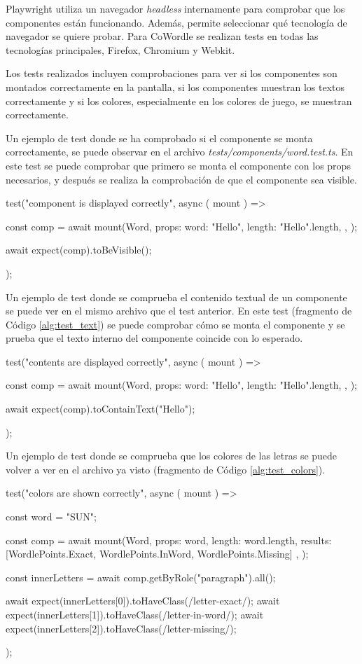 Playwright utiliza un navegador \textit{headless} internamente para comprobar que los componentes están funcionando. Además, permite seleccionar qué tecnología de navegador se quiere probar. Para CoWordle se realizan tests en todas las tecnologías principales, Firefox, Chromium y Webkit.

Los tests realizados incluyen comprobaciones para ver si los componentes son montados correctamente en la pantalla, si los componentes muestran los textos correctamente y si los colores, especialmente en los colores de juego, se muestran correctamente.

Un ejemplo de test donde se ha comprobado si el componente se monta correctamente, se puede observar en el archivo \textit{tests/components/word.test.ts}. En este test se puede comprobar que primero se monta el componente con los props necesarios, y después se realiza la comprobación de que el componente sea visible.

\begin{mytypescript}[float={!h},caption={Ejemplo test visibilidad componente.},label={alg:test_visibility}]
	test("component is displayed correctly", async ({ mount }) => {
		const comp = await mount(Word, {
			props: {
				word: "Hello",
				length: "Hello".length,
			},
		});

		await expect(comp).toBeVisible();
	});
\end{mytypescript}

Un ejemplo de test donde se comprueba el contenido textual de un componente se puede ver en el mismo archivo que el test anterior.
En este test (fragmento de Código \ref{alg:test_text}) se puede comprobar cómo se monta el componente y se prueba que el texto interno del componente coincide con lo esperado.

\begin{mytypescript}[float={!h},caption={Ejemplo test con texto.},label={alg:test_text}]
	test("contents are displayed correctly", async ({ mount }) => {
		const comp = await mount(Word, {
			props: {
				word: "Hello",
				length: "Hello".length,
			},
		});


		await expect(comp).toContainText("Hello");
	});
\end{mytypescript}

Un ejemplo de test donde se comprueba que los colores de las letras se puede volver a ver en el archivo ya visto (fragmento de Código \ref{alg:test_colors}).

\begin{mytypescript}[float={!h},caption={Ejemplo test colores.},label={alg:test_colors}]
	test("colors are shown correctly", async ({ mount }) => {
		const word = "SUN";


		const comp = await mount(Word, {
			props: {
				word,
				length: word.length,
				results: [WordlePoints.Exact, WordlePoints.InWord, WordlePoints.Missing]
			},
		});


		const innerLetters = await comp.getByRole("paragraph").all();


		await expect(innerLetters[0]).toHaveClass(/letter-exact/);
		await expect(innerLetters[1]).toHaveClass(/letter-in-word/);
		await expect(innerLetters[2]).toHaveClass(/letter-missing/);
	});
\end{mytypescript}

